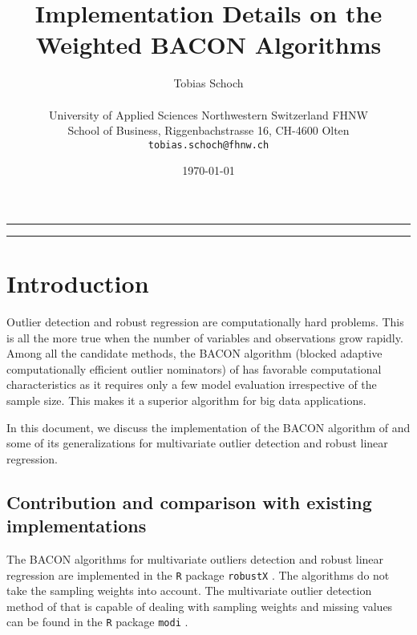 \documentclass[a4paper,oneside,11pt,DIV=12]{scrartcl}
\newcommand{\code}[1]{{\texttt{#1}}}
\begin{document}

\title{\Large Implementation Details on the Weighted BACON Algorithms}

\author{{\normalsize Tobias Schoch} \\ 
\begin{minipage}[t][][t]{\textwidth}
	\begin{center}
	\small{University of Applied Sciences Northwestern Switzerland FHNW} \\
	\small{School of Business, Riggenbachstrasse 16, CH-4600 Olten} \\
	\small{\texttt{tobias.schoch{@}fhnw.ch}}
	\end{center}
\end{minipage}} 

\date{{\small \today}}
\maketitle

\vspace{1em}
\hrule
\vspace{-0.5em}
\setcounter{tocdepth}{2}
\tableofcontents
\vspace{0.5em}
\hrule
\vspace{1em}

\section{Introduction}\label{ch:introduction}
Outlier detection and robust regression are computationally hard problems. This is all the more true when the number of variables and observations grow rapidly. Among all the candidate methods, the BACON algorithm (blocked adaptive computationally efficient outlier nominators) of \citet{billor_hadi_etal_2000} has favorable computational characteristics as it requires only a few model evaluation irrespective of the sample size. This makes it a superior algorithm for big data applications. 

In this document, we discuss the implementation of the BACON algorithm of \citet{billor_hadi_etal_2000} and some of its generalizations for multivariate outlier detection and robust linear regression.

\subsection{Contribution and comparison with existing implementations} 
The BACON algorithms for multivariate outliers detection and robust linear regression are implemented in the \code{R} package \code{robustX} \citep{stahel_maechler_etal_2019}. The algorithms do not take the sampling weights into account. The multivariate outlier detection method of \citet{beguin_hulliger_2008} that is capable of dealing with sampling weights and missing values can be found in the \code{R} package \code{modi} \citep{hulliger_sterchi_2020}.
\end{document}
